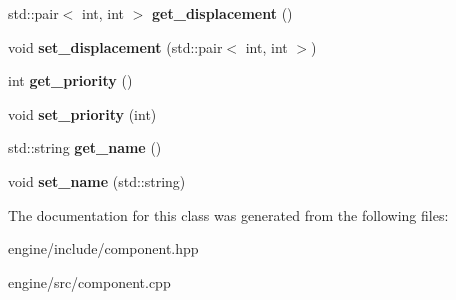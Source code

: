 \begin{DoxyCompactItemize}
\item 
std\+::pair$<$ int, int $>$ {\bfseries get\+\_\+displacement} ()\hypertarget{classengine_1_1_component_a3a79b22c29f442c6f4b6fb648e97dc47}{}\label{classengine_1_1_component_a3a79b22c29f442c6f4b6fb648e97dc47}

\item 
void {\bfseries set\+\_\+displacement} (std\+::pair$<$ int, int $>$)\hypertarget{classengine_1_1_component_a9b8b506c27cd4fe0080deaf9ffe2b9be}{}\label{classengine_1_1_component_a9b8b506c27cd4fe0080deaf9ffe2b9be}

\item 
int {\bfseries get\+\_\+priority} ()\hypertarget{classengine_1_1_component_a9b786021a986a812d841983e36bea127}{}\label{classengine_1_1_component_a9b786021a986a812d841983e36bea127}

\item 
void {\bfseries set\+\_\+priority} (int)\hypertarget{classengine_1_1_component_aa746b97a8ad828e50a957d89afcb68b6}{}\label{classengine_1_1_component_aa746b97a8ad828e50a957d89afcb68b6}

\item 
std\+::string {\bfseries get\+\_\+name} ()\hypertarget{classengine_1_1_component_abf17998eda9a0e631c6f8adfff9ccd0a}{}\label{classengine_1_1_component_abf17998eda9a0e631c6f8adfff9ccd0a}

\item 
void {\bfseries set\+\_\+name} (std\+::string)\hypertarget{classengine_1_1_component_abfd84eba8f33f57affa5d46ac074a63d}{}\label{classengine_1_1_component_abfd84eba8f33f57affa5d46ac074a63d}

\end{DoxyCompactItemize}


The documentation for this class was generated from the following files\+:\begin{DoxyCompactItemize}
\item 
engine/include/component.\+hpp\item 
engine/src/component.\+cpp\end{DoxyCompactItemize}
